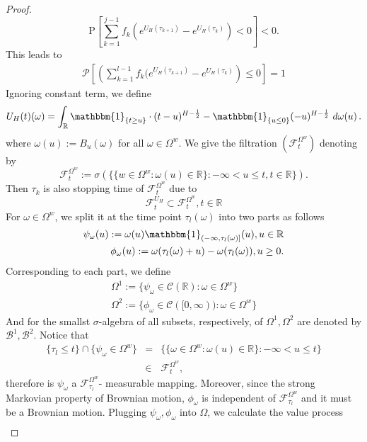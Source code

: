 \documentclass[a4paper, twoside, 11pt]{article}
\theoremstyle{definition}
\newcommand{\brkt}[1]{\left({#1} \right)}
\begin{document}
\begin{proof}
	$$
	\mathrm{P}[\sum_{k=1}^{j-1} f_k (e^{U_H(\tau_{k+1})} - e^{U_H(\tau_k)}) < 0] < 0 .
	$$
  This leads to
  \begin{eqnarray*}
	\mathcal{P} \left[\brkt{\sum_{k=1}^{l-1} f_k (e^{U_H(\tau_{k+1})} - e^{U_H(\tau_k)}} \le 0\right] = 1 
  \end{eqnarray*}
  Ignoring constant term, we define 
  $$
  U_H(t)(\omega) = \int_{\mathbb{R}} \mathbbm{1}_{\{t\ge u\}}\cdot (t-u)^{H-\frac{1}{2}} - \mathbbm{1}_{\{u\le 0\}} (-u)^{H-\frac{1}{2}} \, \mathop{d\omega(u)} .
  $$
  where $\omega(u) := B_u(\omega)$ for all $\omega \in \Omega^w$.
  We give the filtration $(\mathcal{F}_t^{\Omega^w})$ denoting by 
  $$
  \mathcal{F}_t^{\Omega^w} := \sigma(\{\{w \in \Omega^w : \omega(u) \in \mathbb{R}\} : -\infty < u \le t, t\in\mathbb{R}\}).
  $$
  Then $\tau_k$ is also stopping time of $\mathcal{F}_t^{\Omega^w}$ due to
  $$
  \mathcal{F}^{U_H}_t \subset \mathcal{F}_t^{\Omega^w},	t \in \mathbb{R}
  $$
 For $\omega \in \Omega^w$, we split it at the time point $\tau_l(\omega)$ into two parts as follows
 \begin{eqnarray*}
 \psi_{\omega}(u) := \omega(u)\mathbbm{1}_{(-\infty, \tau_l(\omega)]}(u), u\in \mathbb{R} \\
   \phi_{\omega}(u) := \omega(\tau_l(\omega) + u) - \omega(\tau_l(\omega)), u\ge 0.
 \end{eqnarray*}
Corresponding to each part, we define
\begin{eqnarray*}
  \Omega^1 := \{\psi_{\omega} \in \mathcal{C}(\mathbb{R}) : \omega \in \Omega^w\}\\
  \Omega^2 := \{\phi_{\omega} \in \mathcal{C}([0, \infty)) : \omega \in \Omega^w\}
\end{eqnarray*}
And for the smallst $\sigma$-algebra of all subsets, respectively, of $\Omega^1, \Omega^2$ are denoted by $\mathscr{B}^1, \mathscr{B}^2$.
Notice that
\begin{eqnarray*}
  \{\tau_l \le t\} \cap \{\psi_{\omega} \in \Omega^w\} &=& \{\{\omega \in \Omega^w : \omega(u) \in \mathbb{R}\} : -\infty < u \le t\}\\
  &\in& \mathcal{F}^{\Omega^w}_t,
\end{eqnarray*}
therefore is $\psi_{\omega}$ a $\mathcal{F}^{\Omega^w}_{\tau_l}$- measurable mapping. Moreover, since the strong Markovian property of Brownian motion, $\phi_{\omega}$ is independent of $\mathcal{F}^{\Omega^w}_{\tau_l}$ and it must be a Brownian motion.  Plugging  $\psi_{\omega}, \phi_{\omega}$ into $\Omega$, we calculate the value process
\begin{eqnarray*}

\end{eqnarray*}
\end{proof}
\end{document}
